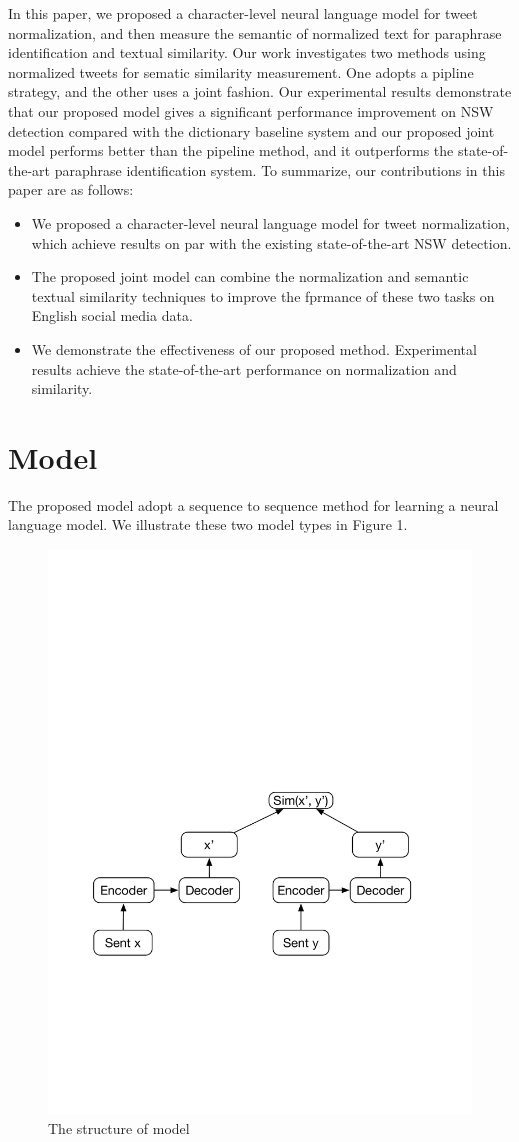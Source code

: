 \documentclass[letterpaper]{article}
\begin{document}
In this paper, we proposed a character-level neural language model for tweet normalization, and then measure the semantic of normalized text for paraphrase identification and textual similarity. Our work investigates two methods using normalized tweets for sematic similarity measurement. One adopts a pipline strategy, and the other uses a joint fashion. Our experimental results demonstrate that our proposed model gives a significant performance improvement on NSW detection compared with the dictionary baseline system and our proposed joint model performs better than the pipeline method, and it outperforms the state-of-the-art paraphrase identification system. To summarize, our contributions in this paper are as follows:

\begin{itemize}
	\item We proposed a character-level neural language model for tweet normalization, which achieve results on par with the existing state-of-the-art NSW detection.
	\item The proposed joint model can combine the normalization and semantic textual similarity techniques to improve the fprmance of these two tasks on English social media data.
	\item We demonstrate the effectiveness of our proposed method. Experimental results achieve the state-of-the-art performance on normalization and similarity.
\end{itemize}

\section{Model}
The proposed model adopt a sequence to sequence method for learning a neural language model. We illustrate these two model types in Figure 1.
\begin{figure}
\centering
\includegraphics[width=0.7\linewidth]{model}
\caption{The structure of model}
\label{fig:model}
\end{figure}
\end{document}
